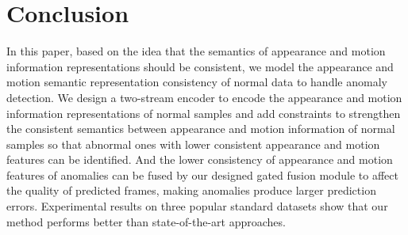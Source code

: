 \documentclass[sigconf]{acmart}
\begin{document}
\section{Conclusion}
In this paper, based on the idea that the semantics of appearance and motion information representations should be consistent, we model the appearance and motion semantic representation consistency of normal data to handle anomaly detection. We design a two-stream encoder to encode the appearance and motion information representations of normal samples and add constraints to strengthen the consistent semantics between appearance and motion information of normal samples so that abnormal ones with lower consistent appearance and motion features can be identified. And the lower consistency of appearance and motion features of anomalies can be fused by our designed gated fusion module to affect the quality of predicted frames, making anomalies produce larger prediction errors. Experimental results on three popular standard datasets show that our method performs better than state-of-the-art approaches.




\end{document}
